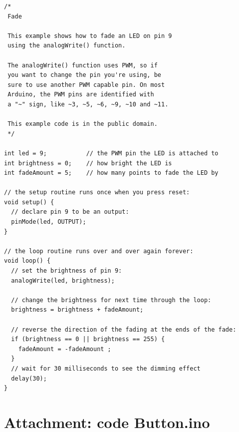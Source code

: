 \documentclass{arduino}
\begin{document}
\begin{minipage}{\widemargin}
\begin{lstlisting}
/*
 Fade

 This example shows how to fade an LED on pin 9
 using the analogWrite() function.

 The analogWrite() function uses PWM, so if
 you want to change the pin you're using, be
 sure to use another PWM capable pin. On most
 Arduino, the PWM pins are identified with 
 a "~" sign, like ~3, ~5, ~6, ~9, ~10 and ~11.

 This example code is in the public domain.
 */

int led = 9;           // the PWM pin the LED is attached to
int brightness = 0;    // how bright the LED is
int fadeAmount = 5;    // how many points to fade the LED by

// the setup routine runs once when you press reset:
void setup() {
  // declare pin 9 to be an output:
  pinMode(led, OUTPUT);
}

// the loop routine runs over and over again forever:
void loop() {
  // set the brightness of pin 9:
  analogWrite(led, brightness);

  // change the brightness for next time through the loop:
  brightness = brightness + fadeAmount;

  // reverse the direction of the fading at the ends of the fade:
  if (brightness == 0 || brightness == 255) {
    fadeAmount = -fadeAmount ;
  }
  // wait for 30 milliseconds to see the dimming effect
  delay(30);
}
\end{lstlisting}
\end{minipage}

\newpage

\section{Attachment: code Button.ino}
\end{document}
